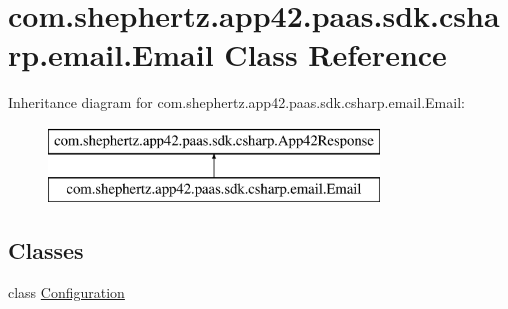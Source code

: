 \hypertarget{classcom_1_1shephertz_1_1app42_1_1paas_1_1sdk_1_1csharp_1_1email_1_1_email}{\section{com.\+shephertz.\+app42.\+paas.\+sdk.\+csharp.\+email.\+Email Class Reference}
\label{classcom_1_1shephertz_1_1app42_1_1paas_1_1sdk_1_1csharp_1_1email_1_1_email}
}
Inheritance diagram for com.\+shephertz.\+app42.\+paas.\+sdk.\+csharp.\+email.\+Email\+:\begin{figure}[H]
\begin{center}
\leavevmode
\includegraphics[height=2.000000cm]{classcom_1_1shephertz_1_1app42_1_1paas_1_1sdk_1_1csharp_1_1email_1_1_email}
\end{center}
\end{figure}
\subsection*{Classes}
\begin{DoxyCompactItemize}
\item 
class \hyperlink{classcom_1_1shephertz_1_1app42_1_1paas_1_1sdk_1_1csharp_1_1email_1_1_email_1_1_configuration}{Configuration}
\end{DoxyCompactItemize}
